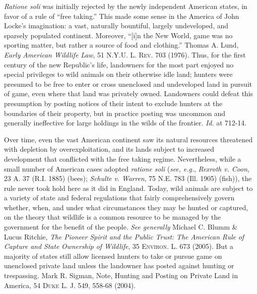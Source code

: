 \textit{Ratione soli} was initially rejected by the newly independent American
states, in favor of a rule of ``free taking.'' This made some sense in the
America of John Locke's imagination: a vast, naturally bountiful, largely
undeveloped, and sparsely populated continent. Moreover, ``[i]n the New World,
game was no sporting matter, but rather a source of food and clothing.'' Thomas
A. Lund, \textit{Early American Wildlife Law}, 51 \textsc{N.Y.U. L. Rev.} 703
(1976). Thus, for the first century of the new Republic's life, landowners for
the most part enjoyed no special privileges to wild animals on their otherwise
idle land; hunters were presumed to be free to enter or cross unenclosed and
undeveloped land in pursuit of game, even where that land was privately owned.
Landowners could defeat this presumption by posting notices of their intent to
exclude hunters at the boundaries of their property, but in practice posting was
uncommon and generally ineffective for large holdings in the wilds of the
frontier. \textit{Id.} at 712-14.

Over time, even the vast American continent saw its natural resources threatened
with depletion by overexploitation, and its lands subject to increased
development that conflicted with the free taking regime. Nevertheless, while a
small number of American cases adopted \textit{ratione soli} (\textit{see,
e.g.}, \emph{Rexroth v. Coon}, 23 A. 37 (R.I. 1885) (bees); \emph{Schulte v.
Warren}, 75 N.E. 783 (Ill. 1905) (fish)), the rule never took hold here as it
did in England. Today, wild animals are subject to a variety of state and
federal regulations that fairly comprehensively govern whether, when, and under
what circumstances they may be hunted or captured, on the theory that wildlife
is a common resource to be managed by the government for the benefit of the
people. \textit{See generally} Michael C. Blumm \& Lucus Ritchie, \textit{The
Pioneer Spirit and the Public Trust: The American Rule of Capture and State
Ownership of Wildlife}, 35 \textsc{Environ. L.} 673 (2005). But a majority of
states still allow licensed hunters to take or pursue game on unenclosed private
land unless the landowner has posted against hunting or trespassing. Mark R.
Sigman, Note, {Hunting and Posting on Private Land in America}, 54 \textsc{Duke
L. J.} 549, 558-68 (2004).


